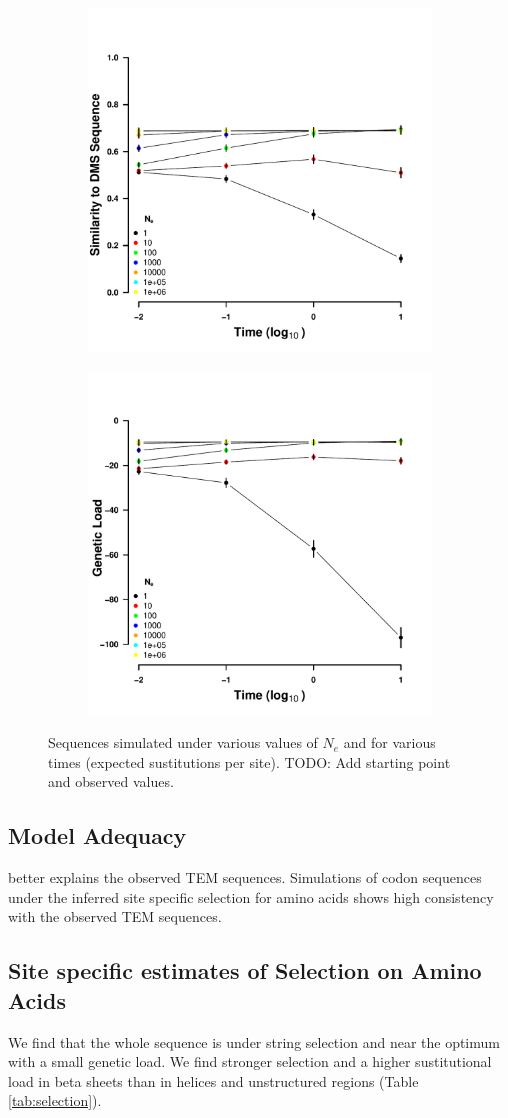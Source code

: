 \documentclass[12pt]{article}
\begin{document}
\begin{figure}[h]
    \centering
    \begin{subfigure}
        \centering
        \includegraphics[width=.45\textwidth]{img/simulated_dist_time.pdf}
    \end{subfigure}
    \begin{subfigure}
        \centering
        \includegraphics[width=.45\textwidth]{img/simulated_gl_time.pdf}
    \end{subfigure}
    \caption{Sequences simulated under various values of $N_e$ and for various times (expected sustitutions per site). TODO: Add starting point and observed values.}
    \label{fig:dms_sim}
\end{figure}

\subsection*{\selac Model Adequacy}
\selac better explains the observed TEM sequences.
Simulations of codon sequences under the \selac inferred site specific selection for amino acids shows high consistency with the observed TEM sequences.

\subsection*{Site specific estimates of Selection on Amino Acids}
We find that the whole sequence is under string selection and near the optimum with a small genetic load.
We find stronger selection and a higher sustitutional load in beta sheets than in helices and unstructured regions (Table \ref{tab:selection}).
\end{document}
